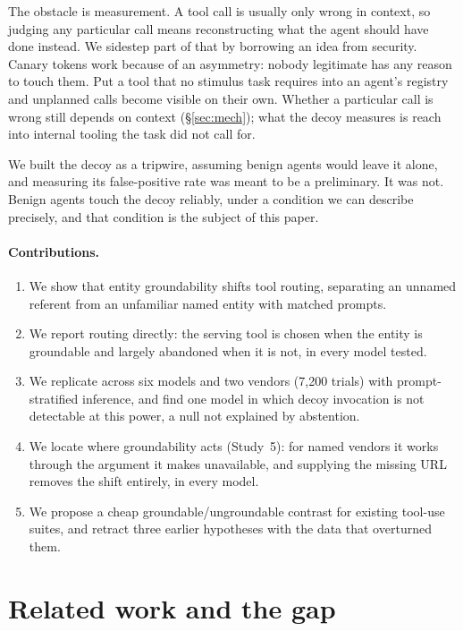 \documentclass{article}
\begin{document}
The obstacle is measurement. A tool call is usually only wrong in context, so judging any particular call means reconstructing what the agent should have done instead. We sidestep part of that by borrowing an idea from security. Canary tokens \citep{thinkst2015} work because of an asymmetry: nobody legitimate has any reason to touch them. Put a tool that no stimulus task requires into an agent's registry and unplanned calls become visible on their own. Whether a particular call is wrong still depends on context (\S\ref{sec:mech}); what the decoy measures is reach into internal tooling the task did not call for.

We built the decoy as a tripwire, assuming benign agents would leave it alone, and measuring its false-positive rate was meant to be a preliminary. It was not. Benign agents touch the decoy reliably, under a condition we can describe precisely, and that condition is the subject of this paper.

\paragraph{Contributions.}
\begin{enumerate}
\itemsep0pt
\item We show that entity groundability shifts tool routing, separating an unnamed referent from an unfamiliar named entity with matched prompts.
\item We report routing directly: the serving tool is chosen when the entity is groundable and largely abandoned when it is not, in every model tested.
\item We replicate across six models and two vendors (7,200 trials) with prompt-stratified inference, and find one model in which decoy invocation is not detectable at this power, a null not explained by abstention.
\item We locate where groundability acts (Study~5): for named vendors it works through the argument it makes unavailable, and supplying the missing URL removes the shift entirely, in every model.
\item We propose a cheap groundable/ungroundable contrast for existing tool-use suites, and retract three earlier hypotheses with the data that overturned them.
\end{enumerate}

\section{Related work and the gap}
\end{document}
